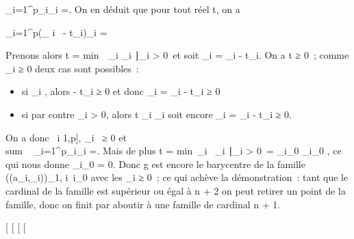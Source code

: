 \documentclass[]{article}
\begin{document}
_i=1^p\lambda_i\overrightarrowga_i
=. On en déduit que pour tout réel
t, on a

\sum _i=1^p(\lambda_ i~ -
t\alpha_i)\overrightarrowga_i
=

Prenons alors t = min~\
\lambda_i \over \alpha_i
∣\alpha_i \textgreater{}
0\ et soit \mu_i = \lambda_i - t\alpha_i.
On a t ≥ 0~; comme \lambda_i ≥ 0 deux cas sont possibles~:

\begin{itemize}
\itemsep1pt\parskip0pt
\item
  si \alpha_i , alors - t\alpha_i ≥ 0 et donc \mu_i =
  \lambda_i - t\alpha_i ≥ 0
\item
  si par contre \alpha_i \textgreater{} 0, alors t \leq \lambda_i
  \over \alpha_i soit encore \mu_i =
  \lambda_i - t\alpha_i ≥ 0.
\end{itemize}

On a donc \forall~i \in {[}1,p{]}, \mu_i~ ≥ 0 et
\\sum ~
_i=1^p\mu_i\overrightarrowga_i
=. Mais de plus t
= min\ \lambda_i~
\over \alpha_i
∣\alpha_i \textgreater{}
0\ = \lambda_i_0 \over
\alpha_i_0 , ce qui nous donne \mu_i_0 =
0. Donc g est encore le barycentre de la famille \left
((a_i,\mu_i)\right )_1\leqi\leqp,
i\neq~i_0 avec les \mu_i ≥ 0~;
ce qui achève la démonstration~: tant que le cardinal de la famille est
supérieur ou égal à n + 2 on peut retirer un point de la famille, donc
on finit par aboutir à une famille de cardinal n + 1.

{[}
{[}
{[}
{[}
\end{document}
